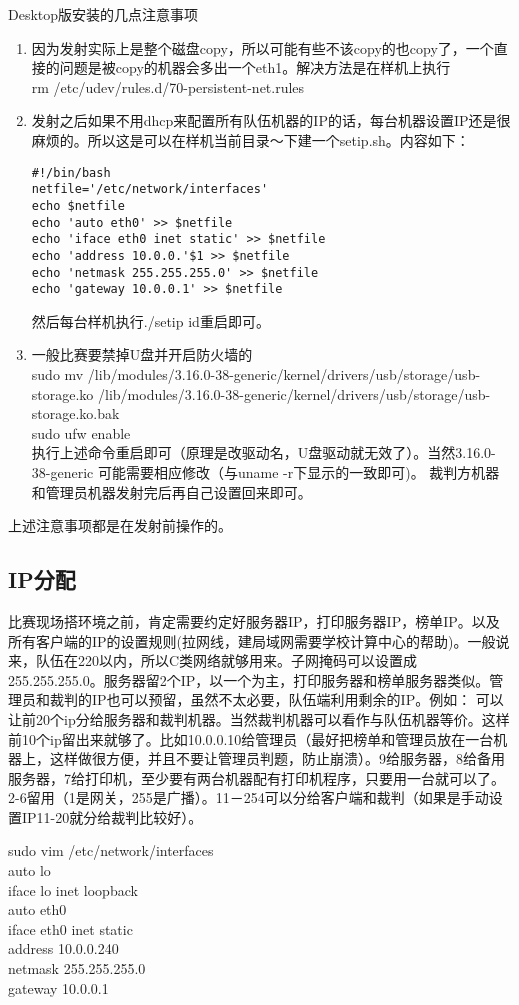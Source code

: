 \documentclass[12pt]{article}
\begin{document}
Desktop版安装的几点注意事项
\begin{enumerate}
\item
因为发射实际上是整个磁盘copy，所以可能有些不该copy的也copy了，一个直接的问题是被copy的机器会多出一个eth1。解决方法是在样机上执行 \\
rm /etc/udev/rules.d/70-persistent-net.rules
\item
发射之后如果不用dhcp来配置所有队伍机器的IP的话，每台机器设置IP还是很麻烦的。所以这是可以在样机当前目录～下建一个setip.sh。内容如下：
\begin{verbatim}
#!/bin/bash
netfile='/etc/network/interfaces'
echo $netfile
echo 'auto eth0' >> $netfile
echo 'iface eth0 inet static' >> $netfile
echo 'address 10.0.0.'$1 >> $netfile
echo 'netmask 255.255.255.0' >> $netfile
echo 'gateway 10.0.0.1' >> $netfile
\end{verbatim}
然后每台样机执行./setip id重启即可。
\item
一般比赛要禁掉U盘并开启防火墙的 \\
sudo mv /lib/modules/3.16.0-38-generic/kernel/drivers/usb/storage/usb-storage.ko /lib/modules/3.16.0-38-generic/kernel/drivers/usb/storage/usb-storage.ko.bak \\
sudo ufw enable \\
执行上述命令重启即可（原理是改驱动名，U盘驱动就无效了）。当然3.16.0-38-generic
可能需要相应修改（与uname -r下显示的一致即可)。
裁判方机器和管理员机器发射完后再自己设置回来即可。
\end{enumerate}
上述注意事项都是在发射前操作的。

\subsection*{IP分配}
比赛现场搭环境之前，肯定需要约定好服务器IP，打印服务器IP，榜单IP。以及所有客户端的IP的设置规则(拉网线，建局域网需要学校计算中心的帮助)。一般说来，队伍在220以内，所以C类网络就够用来。子网掩码可以设置成255.255.255.0。服务器留2个IP，以一个为主，打印服务器和榜单服务器类似。管理员和裁判的IP也可以预留，虽然不太必要，队伍端利用剩余的IP。例如：
可以让前20个ip分给服务器和裁判机器。当然裁判机器可以看作与队伍机器等价。这样前10个ip留出来就够了。比如10.0.0.10给管理员（最好把榜单和管理员放在一台机器上，这样做很方便，并且不要让管理员判题，防止崩溃）。9给服务器，8给备用服务器，7给打印机，至少要有两台机器配有打印机程序，只要用一台就可以了。2-6留用（1是网关，255是广播）。11－254可以分给客户端和裁判（如果是手动设置IP11-20就分给裁判比较好）。

sudo vim /etc/network/interfaces \\
auto lo \\
iface lo inet loopback \\
auto eth0 \\
iface eth0 inet static \\
address 10.0.0.240 \\
netmask 255.255.255.0 \\
gateway 10.0.0.1
\end{document}
